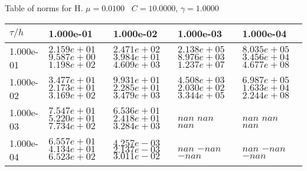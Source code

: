 \begin{center}
Table of norms for H. $\mu = 0.0100$ \, $C = 10.0000$, $\gamma = 1.0000$
  
\begin{tabular}{|p{1in}|p{1in}|p{1in}|p{1in}|p{1in}|} \hline
$\tau / h$ &1.000e-01 &1.000e-02 &1.000e-03 &1.000e-04 \\ \hline 
1.000e-01 & $2.159e+01$  $9.587e+00$  $1.198e+02$  & $2.471e+02$  $3.984e+01$  $4.609e+03$  & $2.138e+05$  $8.976e+03$  $1.237e+07$  & $8.035e+05$  $3.456e+04$  $4.677e+08$  \\ \hline 
1.000e-02 & $3.477e+01$  $2.173e+01$  $3.169e+02$  & $9.931e+01$  $2.285e+01$  $3.479e+03$  & $4.508e+03$  $2.030e+02$  $3.344e+05$  & $6.987e+05$  $1.633e+04$  $2.244e+08$  \\ \hline 
1.000e-03 & $7.547e+01$  $5.220e+01$  $7.734e+02$  & $6.536e+01$  $2.418e+01$  $3.284e+03$  & $nan$  $nan$  $nan$  & $nan$  $nan$  $nan$  \\ \hline 
1.000e-04 & $6.557e+01$  $4.134e+01$  $6.523e+02$  & $4.257e-03$  $2.137e-03$  $3.011e-02$  & $nan$  $-nan$  $-nan$  & $nan$  $-nan$  $-nan$  \\ \hline 

\end{tabular}\\[20pt]
\end{center}
